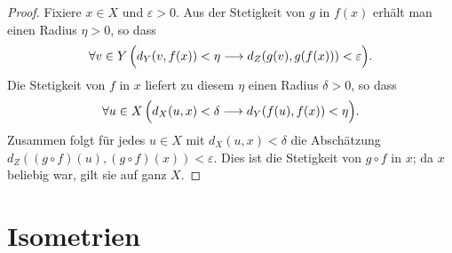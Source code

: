 \documentclass[main.tex]{subfiles}
\begin{document}
\begin{proof}
Fixiere \(x\in X\) und \(\varepsilon>0\). Aus der Stetigkeit von \(g\) in
\(f(x)\) erhält man einen Radius \(\eta>0\), so dass
\[
 \forall v\in Y\,
 \Bigl(d_Y(v,f(x))<\eta
 \longrightarrow
 d_Z(g(v),g(f(x)))<\varepsilon\Bigr).
\]
Die Stetigkeit von \(f\) in \(x\) liefert zu diesem \(\eta\) einen Radius
\(\delta>0\), so dass
\[
 \forall u\in X\,
 \Bigl(d_X(u,x)<\delta
 \longrightarrow
 d_Y(f(u),f(x))<\eta\Bigr).
\]
Zusammen folgt für jedes \(u\in X\) mit \(d_X(u,x)<\delta\) die Abschätzung
\(d_Z((g\circ f)(u),(g\circ f)(x))<\varepsilon\). Dies ist die
Stetigkeit von \(g\circ f\) in \(x\); da \(x\) beliebig war, gilt sie auf
ganz \(X\).
\end{proof}

\section{Isometrien}

\end{document}
